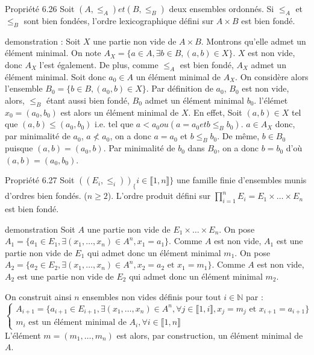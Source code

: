 \documentclass{article}
\begin{document}
\begin{adjustwidth}{-3cm}{-3cm}
    Propriété 6.26
    Soit $(A,\leq_A) et (B,\leq_B)$ deux ensembles ordonnés.
    Si $\leq_A$ et $\leq_B$ sont bien fondées, l'ordre lexicographique défini sur $A \times B$ est bien fondé.

    demonstration : 
    Soit $X$ une partie non vide de $A \times B$. Montrons qu'elle admet un élément minimal.
    On note $A_X = \{a \in A, \exists b \in B, (a,b) \in X\}$. $X$ est non vide, donc $A_X$ l'est également.
    De plus, comme $\leq_A$ est bien fondé, $A_X$ admet un élément minimal.
    Soit donc $a_0 \in A$ un élément minimal de $A_X$. On considère alors l'ensemble $B_0 = \{b \in B, (a_0,b) \in X\}$.
    Par définition de $a_0$, $B_0$ est non vide, alors, $\leq_B$ étant aussi bien fondé, $B_0$ admet un élément minimal $b_0$. l'élémet $x_0 = (a_0, b_0)$ est alors un élément minimal de $X$.
    En effet, Soit $(a,b) \in X$ tel que $(a,b) \leq (a_0,b_0)$ i.e. tel que $a < a_0 ou (a = a_0 et b \leq_B b_0)$.
    $a \in A_X$ donc, par minimalité de $a_0$, $a \nless a_0$, on a donc $a = a_0$ et $b \leq_B b_0$.
    De même, $b \in B_0$ puisque $(a,b) = (a_0,b)$. Par minimalité de $b_0$ dans $B_0$, on a donc $b = b_0$ d'où $(a,b) = (a_0,b_0)$.

    Propriété 6.27
    Soit $((E_i,\leq_i))_\{i \in \llbracket 1,n \rrbracket \}$ une famille finie d'ensembles munis d'ordres bien fondés. ($n \geq 2$). L'ordre produit défini sur $\displaystyle \prod_{i=1}^{n}E_i = E_1 \times \ldots \times E_n$ est bien fondé.

    demonstration Soit $A$ une partie non vide de $E_1 \times \ldots \times E_n$.
    On pose $A_1 = \{a_1 \in E_1, \exists (x_1,\ldots,x_n) \in A^n, x_1 = a_1\}$. Comme $A$ est non vide, $A_1$ est une partie non vide de $E_1$ qui admet donc un élément minimal $m_1$.
    On pose $A_2 = \{a_2 \in E_2, \exists (x_1,\ldots,x_n) \in A^n, x_2 = a_2 \text{ et } x_1 = m_1\}$. Comme $A$ est non vide, $A_2$ est une partie non vide de $E_2$ qui admet donc un élément minimal $m_2$. 

    On construit ainsi $n$ ensembles non vides définis pour tout $i \in \mathbb{N}$ par : 
    $$\begin{cases}
        A_{i+1} = \{a_{i+1} \in E_{i+1}, \exists (x_1, \ldots, x_n) \in A^n, \forall j \in \llbracket 1, i \rrbracket, x_j = m_j \text{ et } x_{i+1} = a_{i+1}\} \\
        m_i \text{ est un élément minimal de } A_i, \forall i \in \llbracket 1,n \rrbracket 
    \end{cases}$$
    L'élément $m = (m_1, \ldots, m_n)$ est alors, par construction, un élément minimal de $A$.


\end{adjustwidth}
\end{document}
